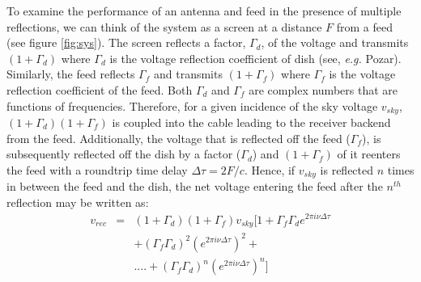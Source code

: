 \documentclass[twocolumn]{emulateapj}
\newcommand{\volt}{{v}}
\newcommand{\dfngexp}{{e^{2\pi i\nu \Delta \tau}}}
\begin{document}
    To examine the performance of an antenna and feed in the presence of multiple
    reflections, we can think of the system as a screen at a distance $F$ from a
    feed (see figure \ref{fig:sys}).  The screen reflects a factor, $\Gamma_d$, of the voltage
    and transmits $(1+\Gamma_d)$ where $\Gamma_{d}$ is the voltage reflection coefficient of dish (see, {\em e.g.} Pozar).  Similarly, the feed
    reflects $\Gamma_f$ and transmits $(1+\Gamma_f)$ where $\Gamma_{f}$ is the voltage reflection coefficient of the feed.  Both $\Gamma_{d}$ and $\Gamma_{f}$ are complex numbers that  
    are functions of frequencies. Therefore, for a given incidence of the sky voltage
    $\volt_{sky}$,  $(1+\Gamma_{d})(1+\Gamma_{f})$
    is coupled into the cable leading to the receiver backend from the feed.  Additionally, the 
    voltage that is reflected off the feed ($\Gamma_f$), is subsequently reflected off the dish by a factor
    ($\Gamma_d$) and $(1+\Gamma_{f})$ of it reenters the feed with a
    roundtrip time delay $\Delta \tau=2F/c$. Hence, if $v_{sky}$ is reflected $n$
    times in between the feed and the dish, the net voltage entering the feed after
    the $n^{th}$ reflection may be written as:
    \begin{eqnarray}
    \volt_{rec} & = &  (1+\Gamma_d) (1+\Gamma_{f}) \volt_{sky}[1+ \Gamma_{f}\Gamma_{d} \dfngexp \nonumber \\
    	&& + (\Gamma_{f}\Gamma_{d})^2  (\dfngexp)^{2}+ \nonumber \\
    &&  ....+ (\Gamma_{f}\Gamma_{d})^{n} (\dfngexp)^{n}]
    \label{eq6}
    \end{eqnarray}
    
\end{document}
